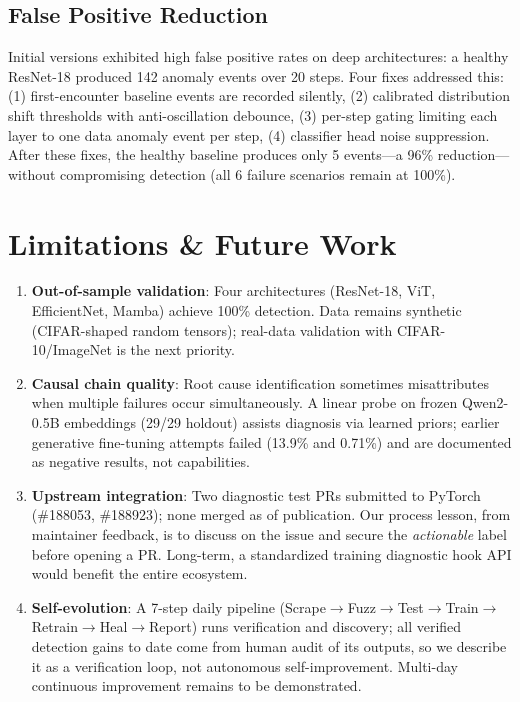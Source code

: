 \documentclass[11pt]{article}
\begin{document}
\subsection{False Positive Reduction}

Initial versions exhibited high false positive rates on deep architectures: a healthy ResNet-18 produced 142 anomaly events over 20 steps. Four fixes addressed this: (1) first-encounter baseline events are recorded silently, (2) calibrated distribution shift thresholds with anti-oscillation debounce, (3) per-step gating limiting each layer to one data anomaly event per step, (4) classifier head noise suppression. After these fixes, the healthy baseline produces only 5 events---a 96\% reduction---without compromising detection (all 6 failure scenarios remain at 100\%).

\section{Limitations \& Future Work}

\begin{enumerate}
    \item \textbf{Out-of-sample validation}: Four architectures (ResNet-18, ViT, EfficientNet, Mamba) achieve 100\% detection. Data remains synthetic (CIFAR-shaped random tensors); real-data validation with CIFAR-10/ImageNet is the next priority.
    \item \textbf{Causal chain quality}: Root cause identification sometimes misattributes when multiple failures occur simultaneously. A linear probe on frozen Qwen2-0.5B embeddings (29/29 holdout) assists diagnosis via learned priors; earlier generative fine-tuning attempts failed (13.9\% and 0.71\%) and are documented as negative results, not capabilities.
    \item \textbf{Upstream integration}: Two diagnostic test PRs submitted to PyTorch (\#188053, \#188923); none merged as of publication. Our process lesson, from maintainer feedback, is to discuss on the issue and secure the \emph{actionable} label before opening a PR. Long-term, a standardized training diagnostic hook API would benefit the entire ecosystem.
    \item \textbf{Self-evolution}: A 7-step daily pipeline (Scrape$\rightarrow$Fuzz$\rightarrow$Test$\rightarrow$Train$\rightarrow$Retrain$\rightarrow$Heal$\rightarrow$Report) runs verification and discovery; all verified detection gains to date come from human audit of its outputs, so we describe it as a verification loop, not autonomous self-improvement. Multi-day continuous improvement remains to be demonstrated.
\end{enumerate}
\end{document}
